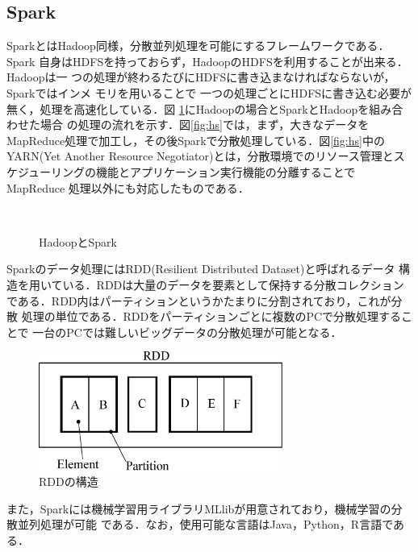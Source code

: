 \documentclass[a4paper,12pt]{jarticle}
\begin{document}
\subsection{Spark}
SparkとはHadoop同様，分散並列処理を可能にするフレームワークである．Spark
自身はHDFSを持っておらず，HadoopのHDFSを利用することが出来る．Hadoopは一
つの処理が終わるたびにHDFSに書き込まなければならないが，Sparkではインメ
モリを用いることで
一つの処理ごとにHDFSに書き込む必要が無く，処理を高速化している．図
\ref{fig:Hadoop_vs_Spark}にHadoopの場合とSparkとHadoopを組み合わせた場合
の処理の流れを示す．図\ref{fig:hs}では，まず，大きなデータを
MapReduce処理で加工し，その後Sparkで分散処理している．図\ref{fig:hs}中の
YARN(Yet Another Resource Negotiator)とは，分散環境でのリソース管理とス
ケジューリングの機能とアプリケーション実行機能の分離することでMapReduce
処理以外にも対応したものである．
%
 \begin{figure}
  \begin{center}
   \\
  \end{center}
  \caption{HadoopとSpark}
  \label{fig:Hadoop_vs_Spark}
 \end{figure}
%
Sparkのデータ処理にはRDD(Resilient Distributed Dataset)と呼ばれるデータ
構造を用いている．RDDは大量のデータを要素として保持する分散コレクション
である．RDD内はパーティションというかたまりに分割されており，これが分散
処理の単位である．RDDをパーティションごとに複数のPCで分散処理することで
一台のPCでは難しいビッグデータの分散処理が可能となる．
%
\begin{figure}[bp]
 \begin{center}
  \includegraphics[width=80mm]{fig/RDD.eps}
  \caption{RDDの構造}
  \label{fig:RDD}
 \end{center}
\end{figure}
%
また，Sparkには機械学習用ライブラリMLlibが用意されており，機械学習の分散並列処理が可能
である．なお，使用可能な言語はJava，Python，R言語である．
\end{document}
